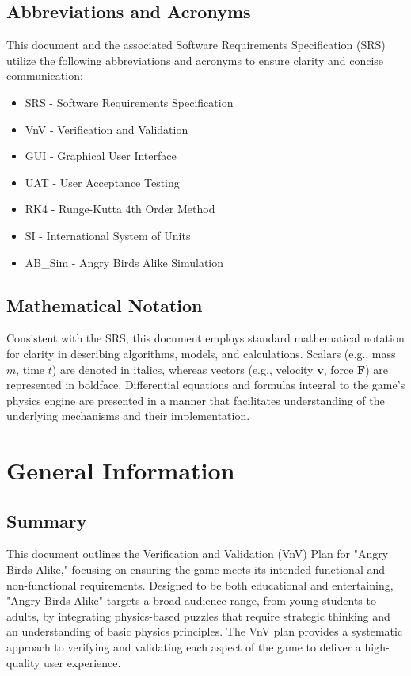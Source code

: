\documentclass[12pt]{article}
\begin{document}
\subsection{Abbreviations and Acronyms}
This document and the associated Software Requirements Specification (SRS) utilize the following abbreviations and acronyms to ensure clarity and concise communication:

\begin{itemize}
    \item SRS - Software Requirements Specification
    \item VnV - Verification and Validation
    \item GUI - Graphical User Interface
    \item UAT - User Acceptance Testing
    \item RK4 - Runge-Kutta 4th Order Method
    \item SI - International System of Units
    \item AB\_Sim - Angry Birds Alike Simulation
\end{itemize}

\subsection{Mathematical Notation}
Consistent with the SRS, this document employs standard mathematical notation for clarity in describing algorithms, models, and calculations. Scalars (e.g., mass \(m\), time \(t\)) are denoted in italics, whereas vectors (e.g., velocity \(\mathbf{v}\), force \(\mathbf{F}\)) are represented in boldface. Differential equations and formulas integral to the game's physics engine are presented in a manner that facilitates understanding of the underlying mechanisms and their implementation.

\section{General Information}

\subsection{Summary}
This document outlines the Verification and Validation (VnV) Plan for "Angry Birds Alike," focusing on ensuring the game meets its intended functional and non-functional requirements. Designed to be both educational and entertaining, "Angry Birds Alike" targets a broad audience range, from young students to adults, by integrating physics-based puzzles that require strategic thinking and an understanding of basic physics principles. The VnV plan provides a systematic approach to verifying and validating each aspect of the game to deliver a high-quality user experience.
\end{document}
